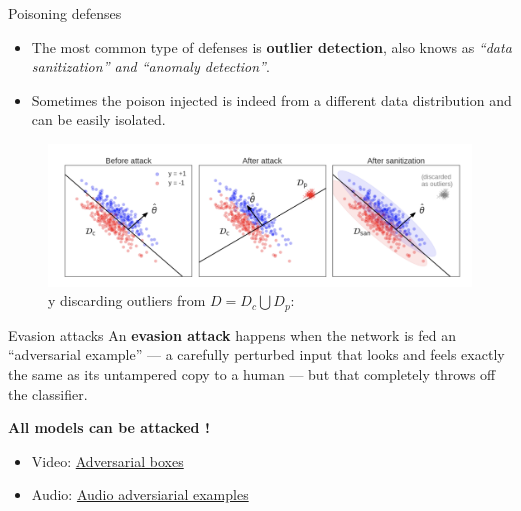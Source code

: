\documentclass{beamer}
\begin{document}
\begin{frame}{Poisoning defenses}
    \begin{itemize}
        \item The most common type of defenses is \textbf{outlier detection}, also knows as \textit{“data sanitization” and “anomaly detection”}. 
        \item Sometimes the poison injected is indeed from a different data distribution and can be easily isolated.
    \end{itemize}
    \begin{figure}
    \centering
    \includegraphics[width=0.9\linewidth]{images/data_poisoning_2.png}
    \caption{y discarding outliers from $D = D_c \bigcup D_p$: \cite{koh2021stronger}}
    \end{figure}
\end{frame}

\begin{frame}{Evasion attacks}
    An \textbf{evasion attack} happens when the network is fed an “adversarial example” — a carefully perturbed input that looks and feels exactly the same as its untampered copy to a human — but that completely throws off the classifier.
    
    \textbf{All models can be attacked !}
    \begin{itemize}
        \item Video: \href{https://github.com/advboxes/AdvBox/blob/master/applications/StealthTshirt/README.md}{Adversarial boxes}
        \item Audio: \href{https://nicholas.carlini.com/code/audio_adversarial_examples/}{Audio adversiarial examples}
    \end{itemize}
\end{frame}
\end{document}
